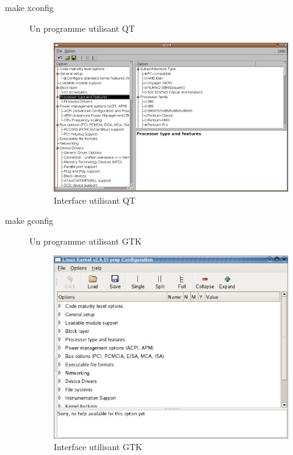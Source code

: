 \documentclass[17pts]{report}
\begin{document}
\begin{description}
\item[make xconfig]             Un programme utilisant QT \\
        \begin{figure}[H]
            \includegraphics[scale=0.4]{illustrations/xconfig.png}
            \centering
            \caption{Interface utilisant QT}
            \label{fig:MakeXconfig}
        \end{figure}
        \pagebreak
\item[make gconfig]             Un programme utilisant GTK \\
        \begin{figure}[H]
            \includegraphics[scale=0.9]{illustrations/gconfig.jpg}
            \centering
            \caption{Interface utilisant GTK}
            \label{fig:MakeGconfig}

\end{figure}
\end{description}
\end{document}
